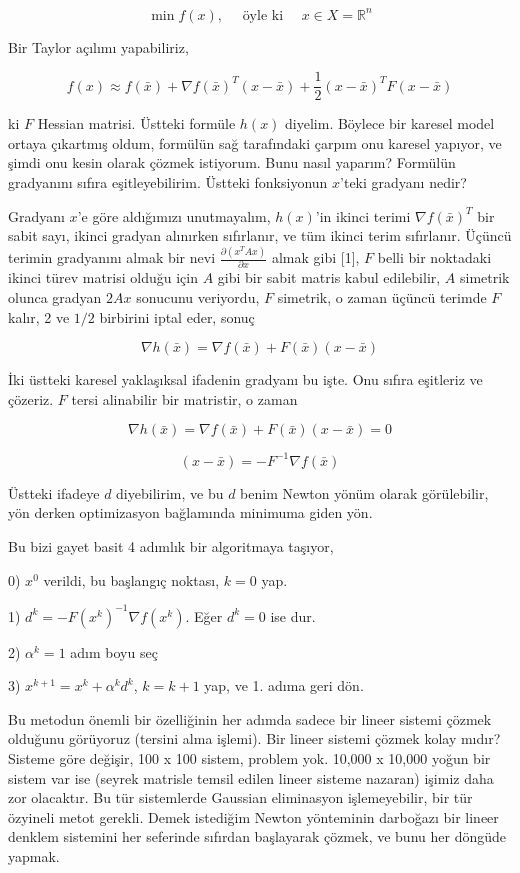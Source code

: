 \documentclass[12pt,fleqn]{article}\usepackage{../../common}
\begin{document}
$$
\min f(x), \quad \textrm{ öyle ki } \quad x \in X = \mathbb{R}^n
$$

Bir Taylor açılımı yapabiliriz,

$$
f(x) \approx 
f(\bar{x}) + 
\nabla f(\bar{x})^T (x-\bar{x}) + 
\frac{1}{2} (x-\bar{x})^T F (x-\bar{x}) 
$$

ki $F$ Hessian matrisi. Üstteki formüle $h(x)$ diyelim. Böylece bir karesel
model ortaya çıkartmış oldum, formülün sağ tarafındaki çarpım onu karesel
yapıyor, ve şimdi onu kesin olarak çözmek istiyorum. Bunu nasıl yaparım?
Formülün gradyanını sıfıra eşitleyebilirim. Üstteki fonksiyonun $x$'teki
gradyanı nedir? 

Gradyanı $x$'e göre aldığımızı unutmayalım, $h(x)$'in ikinci terimi
$\nabla f(\bar{x})^T$ bir sabit sayı, ikinci gradyan alınırken sıfırlanır,
ve tüm ikinci terim sıfırlanır. Üçüncü terimin gradyanını almak bir nevi
$\frac{\partial (x^TAx)}{\partial x}$ almak gibi [1], $F$ belli bir
noktadaki ikinci türev matrisi olduğu için $A$ gibi bir sabit matris kabul
edilebilir, $A$ simetrik olunca gradyan $2Ax$ sonucunu veriyordu, $F$
simetrik, o zaman üçüncü terimde $F$ kalır, 2 ve $1/2$ birbirini iptal
eder, sonuç

$$
\nabla h(\bar{x}) = \nabla f(\bar{x}) + F(\bar{x})(x-\bar{x}) 
$$

İki üstteki karesel yaklaşıksal ifadenin gradyanı bu işte. Onu sıfıra
eşitleriz ve çözeriz. $F$ tersi alinabilir bir matristir, o zaman 

$$
\nabla h(\bar{x}) = \nabla f(\bar{x}) + F(\bar{x})(x-\bar{x}) = 0
$$


$$
(x-\bar{x}) = -F^{-1} \nabla f(\bar{x})
$$
 
Üstteki ifadeye $d$ diyebilirim, ve bu $d$ benim Newton yönüm olarak
görülebilir, yön derken optimizasyon bağlamında minimuma giden yön. 

Bu bizi gayet basit 4 adımlık bir algoritmaya taşıyor,

0) $x^0$ verildi, bu başlangıç noktası, $k = 0$ yap.

1) $d^k = -F(x^k)^{-1} \nabla f(x^k)$. Eğer $d^k=0$ ise dur.

2) $\alpha^k = 1$ adım boyu seç

3) $x^{k+1} = x^k + \alpha^k d^k$, $k = k + 1$ yap, ve 1. adıma geri dön.

Bu metodun önemli bir özelliğinin her adımda sadece bir lineer sistemi
çözmek olduğunu görüyoruz (tersini alma işlemi). Bir lineer sistemi çözmek
kolay mıdır? Sisteme göre değişir, 100 x 100 sistem, problem yok. 10,000 x
10,000 yoğun bir sistem var ise (seyrek matrisle temsil edilen lineer
sisteme nazaran) işimiz daha zor olacaktır. Bu tür sistemlerde Gaussian
eliminasyon işlemeyebilir, bir tür özyineli metot gerekli. Demek istediğim
Newton yönteminin darboğazı bir lineer denklem sistemini her seferinde
sıfırdan başlayarak çözmek, ve bunu her döngüde yapmak.
\end{document}
